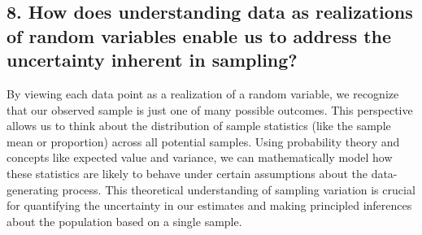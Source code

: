 \documentclass[12pt]{article}
\begin{document}
\subsection*{8. How does understanding data as realizations of random variables enable us to address the uncertainty inherent in sampling?}
By viewing each data point as a realization of a random variable, we recognize that our observed sample is just one of many possible outcomes. This perspective allows us to think about the distribution of sample statistics (like the sample mean or proportion) across all potential samples. Using probability theory and concepts like expected value and variance, we can mathematically model how these statistics are likely to behave under certain assumptions about the data-generating process. This theoretical understanding of sampling variation is crucial for quantifying the uncertainty in our estimates and making principled inferences about the population based on a single sample.
\end{document}
